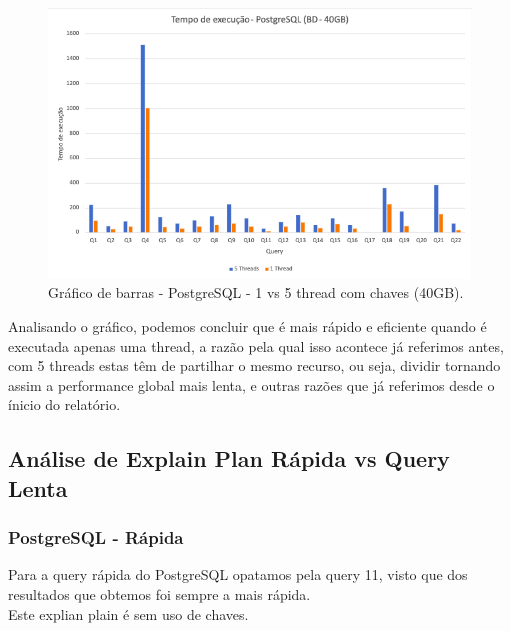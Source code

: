 \documentclass{article}
\begin{document}
\begin{figure}[H]
  \centering
  \includegraphics[width=\textwidth]{Graphs/postgresql40gb.png}
  \caption{Gráfico de barras - PostgreSQL - 1 vs 5 thread com chaves (40GB).} 
  \label{fig:PKCreation2}
\end{figure}

Analisando o gráfico, podemos concluir que é mais rápido e eficiente quando é executada apenas uma thread, a razão pela qual isso acontece já referimos antes, com 5 threads estas têm de partilhar o mesmo recurso, ou seja, dividir tornando assim a performance global mais lenta, e outras razões que já referimos desde o ínicio do relatório. 

\clearpage
\subsection{Análise de Explain Plan Rápida vs Query Lenta}
\subsubsection{PostgreSQL - Rápida}
\texttt{}\par Para a query rápida do PostgreSQL opatamos pela query 11, visto que dos resultados que obtemos foi sempre a mais rápida.\\

Este explian plain é sem uso de chaves.
\end{document}

